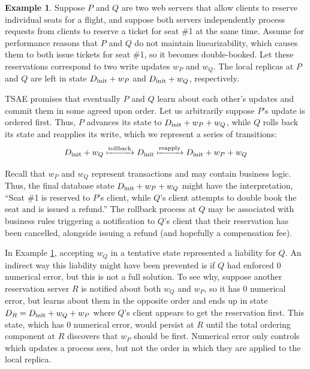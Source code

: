 \documentclass[]             %
{NASA}                       %
\theoremstyle{definition}
\newtheorem{example}[theorem]{Example}
\begin{document}
\begin{example}
  \label{ex:conit-booking}
  Suppose $P$ and $Q$ are two web servers that allow clients to
  reserve individual seats for a flight, and suppose both servers
  independently process requests from clients to reserve a ticket for
  seat \#1 at the same time. Assume for performance reasons that $P$
  and $Q$ do not maintain linearizability, which causes them to both
  issue tickets for seat \#1, so it becomes double-booked. Let these
  reservations correspond to two write updates $w_P$ and $w_Q$. The
  local replicas at $P$ and $Q$ are left in state $D_\textrm{init} + w_P$ and
  $D_\textrm{init} + w_Q$, respectively.

  TSAE promises that eventually $P$ and $Q$ learn about each
  other's updates and commit them in some agreed upon order. Let us
  arbitrarily suppose $P$'s update is ordered first.  Thus, $P$
  advances its state to \mbox{$D_\textrm{init} + w_P + w_Q$}, while $Q$ rolls
  back its state and reapplies its write, which we represent a series
  of transitions:
  \begin{equation*}
    D_\textrm{init} + w_Q \xmapsto{\textrm{rollback}} D_\textrm{init} \xmapsto{\textrm{reapply}} D_\textrm{init} + w_P +
    w_Q
  \end{equation*}

  Recall that $w_P$ and $w_Q$ represent transactions and may contain
  business logic.  Thus, the final database state $D_\textrm{init} + w_P + w_Q$
  might have the interpretation, ``Seat \#1 is reserved to $P$'s
  client, while $Q$'s client attempts to double book the seat and is
  issued a refund.'' The rollback process at $Q$ may be associated
  with business rules triggering a notification to $Q$'s client that
  their reservation has been cancelled, alongside issuing a refund (and
  hopefully a compensation fee).
\end{example}

In Example \ref{ex:conit-booking}, accepting $w_Q$ in a tentative
state represented a liability for $Q$. An indirect way this liability
might have been prevented is if $Q$ had enforced $0$ numerical error,
but this is not a full solution. To see why, suppose another
reservation server $R$ is notified about both $w_Q$ and $w_P$, so it
has $0$ numerical error, but learns about them in the opposite order
and ends up in state $D_R = D_\textrm{init} + w_Q + w_P$ where $Q$'s client
appears to get the reservation first. This state, which has $0$
numerical error, would persist at $R$ until the total ordering
component at $R$ discovers that $w_P$ should be first. Numerical error
only controls which updates a process sees, but not the order in which
they are applied to the local replica.
\end{document}
